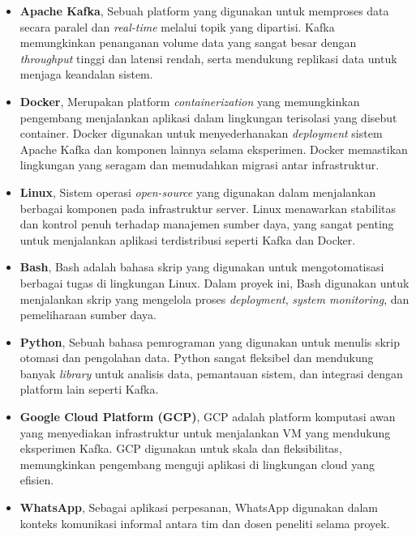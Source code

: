 \begin{itemize}

	\item \textbf{Apache Kafka}, Sebuah platform yang digunakan untuk memproses data secara paralel dan \textit{real-time} melalui topik yang dipartisi. Kafka memungkinkan penanganan volume data yang sangat besar dengan \textit{throughput} tinggi dan latensi rendah, serta mendukung replikasi data untuk menjaga keandalan sistem.

	\item \textbf{Docker}, Merupakan platform \textit{containerization} yang memungkinkan pengembang menjalankan aplikasi dalam lingkungan terisolasi yang disebut container. Docker digunakan untuk menyederhanakan \textit{deployment} sistem Apache Kafka dan komponen lainnya selama eksperimen. Docker memastikan lingkungan yang seragam dan memudahkan migrasi antar infrastruktur.

	\item \textbf{Linux}, Sistem operasi \textit{open-source} yang digunakan dalam menjalankan berbagai komponen pada infrastruktur server. Linux menawarkan stabilitas dan kontrol penuh terhadap manajemen sumber daya, yang sangat penting untuk menjalankan aplikasi terdistribusi seperti Kafka dan Docker.

	\item \textbf{Bash}, Bash adalah bahasa skrip yang digunakan untuk mengotomatisasi berbagai tugas di lingkungan Linux. Dalam proyek ini, Bash digunakan untuk menjalankan skrip yang mengelola proses \textit{deployment}, \textit{system monitoring}, dan pemeliharaan sumber daya.

	\item \textbf{Python}, Sebuah bahasa pemrograman yang digunakan untuk menulis skrip otomasi dan pengolahan data. Python sangat fleksibel dan mendukung banyak \textit{library} untuk analisis data, pemantauan sistem, dan integrasi dengan platform lain seperti Kafka.

	\item \textbf{Google Cloud Platform (GCP)}, GCP adalah platform komputasi awan yang menyediakan infrastruktur untuk menjalankan VM yang mendukung eksperimen Kafka. GCP digunakan untuk skala dan fleksibilitas, memungkinkan pengembang menguji aplikasi di lingkungan cloud yang efisien.

	\item \textbf{WhatsApp}, Sebagai aplikasi perpesanan, WhatsApp digunakan dalam konteks komunikasi informal antara tim dan dosen peneliti selama proyek.

\end{itemize}

